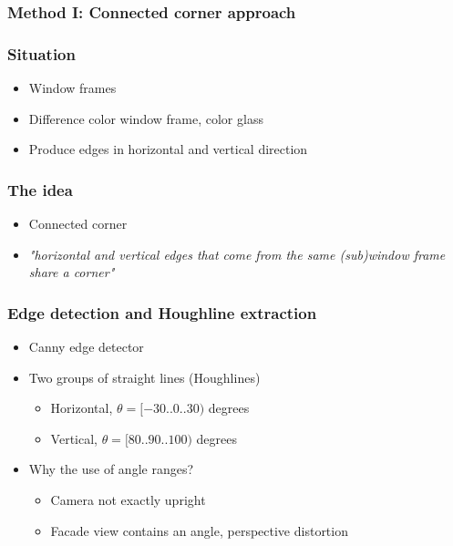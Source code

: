 \documentclass{beamer}
\begin{document}
\frame
{
	\frametitle{Method I: Connected corner approach}
}


\frame
{
	\frametitle{Situation}
	\begin{itemize}
	\item  <+-| alert@+> Window frames 
	\item  <+-| alert@+> Difference color window frame, color glass
	\item  <+-| alert@+> Produce edges in horizontal and vertical direction
	\end{itemize}
}


\frame
{
	\frametitle{The idea}
	\begin{itemize}
	\item  <+-| alert@+> Connected corner
	\item  <+-| alert@+> \emph{"horizontal and vertical edges that come from the same (sub)window frame share
	a corner"}
	\end{itemize}
}


\frame
{
	\frametitle{Edge detection and Houghline extraction}
	\begin{itemize}
	\item Canny edge detector
	\item Two groups of straight lines (Houghlines)
	\begin{itemize}
		\item Horizontal, $\theta = [-30..0..30)$ degrees
		\item Vertical, $\theta = [80..90..100)$ degrees
	\end{itemize}
	\item Why the use of angle ranges?
	\begin{itemize}
		\item Camera not exactly upright
		\item Facade view contains an angle, perspective distortion 
	\end{itemize}
	\end{itemize}

}
\end{document}
